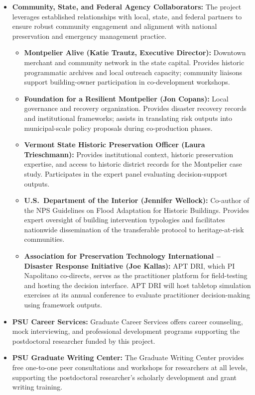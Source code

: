 \documentclass[11pt]{article}
\begin{document}
\begin{itemize}
\item \textbf{Community, State, and Federal Agency Collaborators:}
The project leverages established relationships with local, state, and federal partners to ensure robust community engagement and alignment with national preservation and emergency management practice.
\begin{itemize}
    \item \textbf{Montpelier Alive (Katie Trautz, Executive Director):} Downtown merchant and community network in the state capital. Provides historic programmatic archives and local outreach capacity; community liaisons support building-owner participation in co-development workshops.
    \item \textbf{Foundation for a Resilient Montpelier (Jon Copans):} Local governance and recovery organization. Provides disaster recovery records and institutional frameworks; assists in translating risk outputs into municipal-scale policy proposals during co-production phases.
    \item \textbf{Vermont State Historic Preservation Officer (Laura Trieschmann):} Provides institutional context, historic preservation expertise, and access to historic district records for the Montpelier case study. Participates in the expert panel evaluating decision-support outputs.
    \item \textbf{U.S.\ Department of the Interior (Jennifer Wellock):} Co-author of the NPS Guidelines on Flood Adaptation for Historic Buildings. Provides expert oversight of building intervention typologies and facilitates nationwide dissemination of the transferable protocol to heritage-at-risk communities.
    \item \textbf{Association for Preservation Technology International -- Disaster Response Initiative (Joe Kallas):} APT DRI, which PI Napolitano co-directs, serves as the practitioner platform for field-testing and hosting the decision interface. APT DRI will host tabletop simulation exercises at its annual conference to evaluate practitioner decision-making using framework outputs.
\end{itemize}

\item \textbf{PSU Career Services:}
Graduate Career Services offers career counseling, mock interviewing, and professional development programs supporting the postdoctoral researcher funded by this project.

\item \textbf{PSU Graduate Writing Center:}
The Graduate Writing Center provides free one-to-one peer consultations and workshops for researchers at all levels, supporting the postdoctoral researcher's scholarly development and grant writing training.


\end{itemize}
\end{document}
